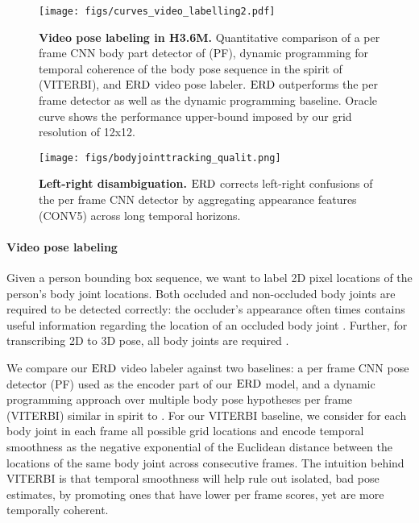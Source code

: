 \documentclass[10pt,twocolumn,letterpaper]{article}
\begin{document}
\begin{figure*}[ht]
\begin{center}
\texttt{[image: figs/curves\_video\_labelling2.pdf]}
\end{center}
\caption{\textbf{Video pose labeling in H3.6M.}  Quantitative comparison of  a per frame CNN body part detector  of \cite{vpsKpsTulsianiM14} (PF), dynamic programming for temporal coherence of the body pose sequence in the spirit of \cite{DBLP:conf/iccv/ParkR11,Batra:2012:DMS:2403138.2403140} (VITERBI), and  $\text{ERD}$ video pose labeler.  $\text{ERD}$  outperforms the per frame detector as well as the dynamic programming baseline.   Oracle curve shows the performance upper-bound  imposed by our grid resolution of 12x12.}
\label{fig:bjtquant}
\end{figure*}




 \begin{figure*}[ht]
 \begin{center}
\texttt{[image: figs/bodyjointtracking\_qualit.png]}
 \end{center}
\caption{\textbf{Left-right disambiguation.} $\text{ERD}$ corrects  left-right confusions of the per frame CNN detector   by  aggregating   appearance  features (CONV5) across long temporal horizons.}
 \label{fig:leftright}
 \end{figure*}



\paragraph{Video pose labeling}
  Given a person bounding  box sequence, we want to label 2D pixel locations of the person's body joint locations. 
Both occluded and non-occluded body joints are required to be detected correctly: the occluder's appearance often times contains useful information regarding the location of an occluded body joint \cite{DBLP:conf/eccv/DesaiR12}. 
  Further, for transcribing 2D to 3D pose, all body joints are required  \cite{Taylor:2000:RAO:364058.364079}. 
  


We compare our $\text{ERD}$ video labeler against two baselines: a per frame CNN pose detector (PF) used as the encoder part of our $\text{ERD}$ model, and a dynamic programming approach over multiple body pose hypotheses per frame (VITERBI) similar in spirit to \cite{DBLP:conf/iccv/ParkR11,Batra:2012:DMS:2403138.2403140}. For our VITERBI baseline, we consider for each body joint in each frame all possible grid locations and encode temporal smoothness as the negative exponential of the Euclidean distance between the locations of the same body joint  across consecutive frames.  The intuition behind VITERBI is that temporal smoothness will help rule out isolated, bad pose estimates, by promoting ones that have lower per frame scores, yet are more temporally coherent.   
\end{document}

